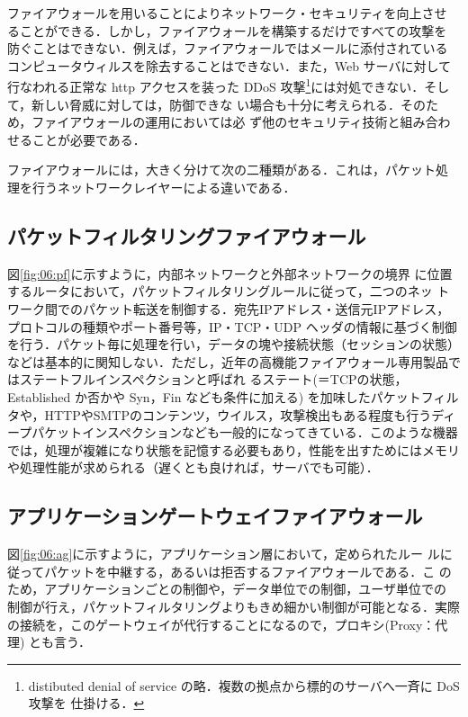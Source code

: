 ファイアウォールを用いることによりネットワーク・セキュリティを向上させ
ることができる．しかし，ファイアウォールを構築するだけですべての攻撃を
防ぐことはできない．例えば，ファイアウォールではメールに添付されている
コンピュータウィルスを除去することはできない．また，Web サーバに対して
行なわれる正常な http アクセスを装った DDoS 攻撃\footnote{distibuted
  denial of service の略．複数の拠点から標的のサーバへ一斉に DoS 攻撃を
  仕掛ける．}には対処できない．そして，新しい脅威に対しては，防御できな
い場合も十分に考えられる．そのため，ファイアウォールの運用においては必
ず他のセキュリティ技術と組み合わせることが必要である．

ファイアウォールには，大きく分けて次の二種類がある．これは，パケット処
理を行うネットワークレイヤーによる違いである．

\subsection*{パケットフィルタリングファイアウォール}
図\ref{fig:06:pf}に示すように，内部ネットワークと外部ネットワークの境界
に位置するルータにおいて，パケットフィルタリングルールに従って，二つのネッ
トワーク間でのパケット転送を制御する．宛先IPアドレス・送信元IPアドレス，
プロトコルの種類やポート番号等，IP・TCP・UDP ヘッダの情報に基づく制御
を行う．パケット毎に処理を行い，データの塊や接続状態（セッションの状態）などは基本的に関知しない．ただし，近年の高機能ファイアウォール専用製品ではステートフルインスペクションと呼ばれ
るステート(＝TCPの状態，Established か否かや Syn，Fin なども条件に加える)
を加味したパケットフィルタや，HTTPやSMTPのコンテンツ，ウイルス，攻撃検出もある程度も行うディープパケットインスペクションなども一般的になってきている．このような機器では，処理が複雑になり状態を記憶する必要もあり，性能を出すためにはメモリや処理性能が求められる（遅くとも良ければ，サーバでも可能）．


\subsection*{アプリケーションゲートウェイファイアウォール}
図\ref{fig:06:ag}に示すように，アプリケーション層において，定められたルー
ルに従ってパケットを中継する，あるいは拒否するファイアウォールである．こ
のため，アプリケーションごとの制御や，データ単位での制御，ユーザ単位での
制御が行え，パケットフィルタリングよりもきめ細かい制御が可能となる．実際
の接続を，このゲートウェイが代行することになるので，プロキシ(Proxy：代理)
とも言う．

